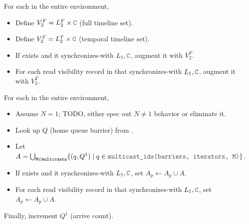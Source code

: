 \filbreak
{} For each  in the entire environment,
\begin{itemize}
  \item Define $V_2^F = L_2^F \times \lighttt{C}$ (full timeline set).
  \filbreak
  \item Define $V_2^T = L_2^T \times \lighttt{C}$ (temporal timeline set).
  \filbreak
  \item If  exists and it synchronizes-with $L_1, \lighttt{C}$, augment it with $V_2^F$.
  \filbreak
  \item For each read visibility record in  that synchronizes-with $L_1, \lighttt{C}$, augment it with $V_2^T$.
\end{itemize}

\filbreak
{} For each  in the entire environment,
\begin{itemize}
  \item Assume $N=1$; TODO, either spec out $N \ne 1$ behavior or eliminate it.
  \filbreak
  \item Look up $Q$ (home queue barrier) from .
  \item Let $A = \bigcup_{\blacktt{M} \in \blacktt{multicasts}} \{ (q, Q^1) \mid q \in \lighttt{multicast\_ids(barriers, iterators, M)} \}$.
  \filbreak
  \item If  exists and it synchronizes-with $L_1, \lighttt{C}$, set $A_p \leftarrow A_p \cup A$.
  \filbreak
  \item For each read visibility record in  that synchronizes-with $L_1, \lighttt{C}$, set $A_p \leftarrow A_p \cup A$.
\end{itemize}
Finally, increment $Q^1$ (arrive count).

